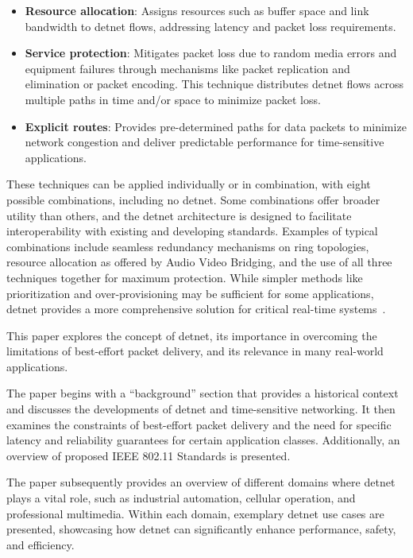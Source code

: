 \documentclass[runningheads]{llncs}
\begin{document}
\begin{itemize}
  \item \textbf{Resource allocation}: Assigns resources such as buffer space and link bandwidth to \gls{detnet} flows, addressing latency and packet loss requirements.
  \item \textbf{Service protection}: Mitigates packet loss due to random media errors and equipment failures through mechanisms like packet replication and elimination or packet encoding. This technique distributes \gls{detnet} flows across multiple paths in time and/or space to minimize packet loss.
  \item \textbf{Explicit routes}: Provides pre-determined paths for data packets to minimize network congestion and deliver predictable performance for time-sensitive applications.
\end{itemize}

These techniques can be applied individually or in combination, with eight possible combinations, including no \gls{detnet}. Some combinations offer broader utility than others, and the \gls{detnet} architecture is designed to facilitate interoperability with existing and developing standards. Examples of typical combinations include seamless redundancy mechanisms on ring topologies, resource allocation as offered by Audio Video Bridging, and the use of all three techniques together for maximum protection. While simpler methods like prioritization and over-provisioning may be sufficient for some applications, \gls{detnet} provides a more comprehensive solution for critical real-time systems~\cite{rfc8655}.

This paper explores the concept of \gls{detnet}, its importance in overcoming the limitations of best-effort packet delivery, and its relevance in many real-world applications.

The paper begins with a ``background'' section that provides a historical context and discusses the developments of \gls{detnet} and time-sensitive networking. It then examines the constraints of best-effort packet delivery and the need for specific latency and reliability guarantees for certain application classes. Additionally, an overview of proposed IEEE 802.11 Standards is presented.

The paper subsequently provides an overview of different domains where \gls{detnet} plays a vital role, such as industrial automation, cellular operation, and professional multimedia. Within each domain, exemplary \gls{detnet} use cases are presented, showcasing how \gls{detnet} can significantly enhance performance, safety, and efficiency.
\end{document}
